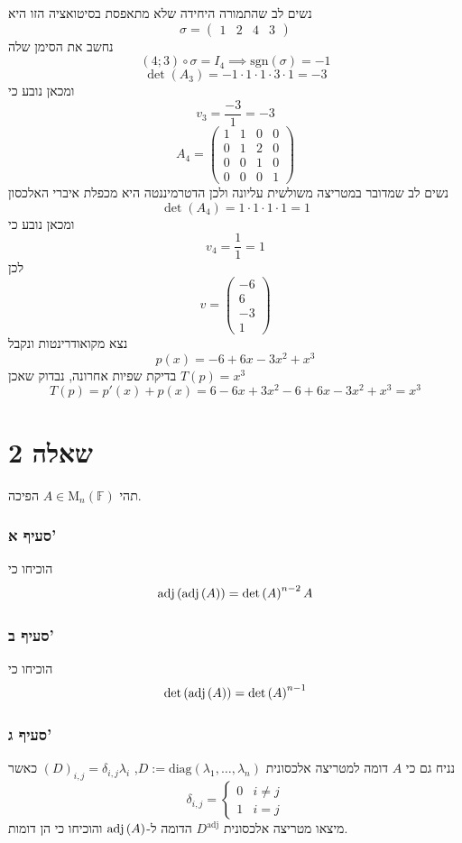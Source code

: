 \documentclass[12pt, titlepage]{article}
\begin{document}
נשים לב שהתמורה היחידה שלא מתאפסת בסיטואציה הזו היא
\[
    \sigma = \begin{pmatrix}
        1 & 2 & 4 & 3
    \end{pmatrix}
\]
נחשב את הסימן שלה
\[
    \left(4;3\right)\circ\sigma = I_4 \implies \mathrm{sgn}\left(\sigma\right) = -1
\]
\[
    \det\left(A_3\right) = -1 \cdot 1 \cdot 1 \cdot 3 \cdot 1 = -3
\]
ומכאן נובע כי
\[
    v_3 = \frac{-3}{1} = -3
\]
\[
A_4  = \begin{pmatrix}
        1 & 1 & 0 & 0 \\
        0 & 1 & 2 & 0 \\
        0 & 0 & 1 & 0 \\
        0 & 0 & 0 & 1
    \end{pmatrix}
\]
נשים לב שמדובר במטריצה משולשית עליונה ולכן הדטרמיננטה היא מכפלת איברי האלכסון
\[
 \det   \left(A_4\right) = 1 \cdot 1 \cdot 1 \cdot 1=  1
\]
ומכאן נובע כי
\[
    v_4 = \frac{1}{1} =1
\]
לכן
\[
    v = \begin{pmatrix}
        -6\\6\\-3\\1
    \end{pmatrix}
\]
נצא מקואודרינטות ונקבל
\[
    p\left(x\right) = -6 + 6x -3x^2 + x^3
\]
בדיקת שפיות אחרונה, נבדוק שאכן $T\left(p\right) = x^3$
\[
    T\left(p\right) = p'\left(x\right) + p\left(x\right) = 6 -6x + 3x^2 -6 + 6x -3x^2 + x^3= x^3
\]
\newpage
\part*{שאלה 2}
תהי $A\in\mathrm{M}_n\left(\mathbb{F}\right)$ הפיכה.
\section*{סעיף א'}
הוכיחו כי
\[
    \mathrm{adj}\left(\mathrm{adj}\left(A\right)\right) = \det\left(A\right)^{n-2}A
\]
\section*{סעיף ב'}
הוכיחו כי
\[
    \det\left(\mathrm{adj}\left(A\right)\right) = \det\left(A\right)^{n-1}
\]
\section*{סעיף ג'}
נניח גם כי $A$ דומה למטריצה אלכסונית $D:=\mathrm{diag}\left(\lambda_1,\ldots,\lambda_n\right)$, $\left(D\right)_{i,j} = \delta_{i,j}\lambda_i$ כאשר
\[
    \delta_{i,j} = \begin{cases}
        0 & i\neq j\\
        1 & i=j
    \end{cases}
\]
מיצאו מטריצה אלכסונית $D^{\mathrm{adj}}$ הדומה ל-$\mathrm{adj}\left(A\right)$ והוכיחו כי הן דומות.
\end{document}
